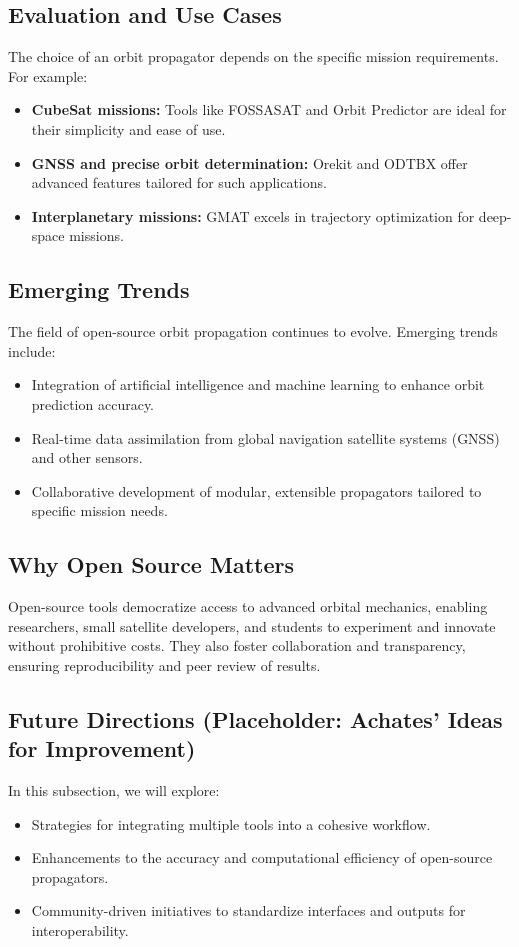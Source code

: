\documentclass[a4paper,10pt]{article}
\begin{document}
\subsection{Evaluation and Use Cases}
The choice of an orbit propagator depends on the specific mission requirements. For example:
\begin{itemize}
    \item \textbf{CubeSat missions:} Tools like FOSSASAT and Orbit Predictor are ideal for their simplicity and ease of use.
    \item \textbf{GNSS and precise orbit determination:} Orekit and ODTBX offer advanced features tailored for such applications.
    \item \textbf{Interplanetary missions:} GMAT excels in trajectory optimization for deep-space missions.
\end{itemize}

\subsection{Emerging Trends}
The field of open-source orbit propagation continues to evolve. Emerging trends include:
\begin{itemize}
    \item Integration of artificial intelligence and machine learning to enhance orbit prediction accuracy.
    \item Real-time data assimilation from global navigation satellite systems (GNSS) and other sensors.
    \item Collaborative development of modular, extensible propagators tailored to specific mission needs.
\end{itemize}

\subsection{Why Open Source Matters}
Open-source tools democratize access to advanced orbital mechanics, enabling researchers, small satellite developers, and students to experiment and innovate without prohibitive costs. They also foster collaboration and transparency, ensuring reproducibility and peer review of results.

\subsection{Future Directions (Placeholder: Achates' Ideas for Improvement)}
In this subsection, we will explore:
\begin{itemize}
    \item Strategies for integrating multiple tools into a cohesive workflow.
    \item Enhancements to the accuracy and computational efficiency of open-source propagators.
    \item Community-driven initiatives to standardize interfaces and outputs for interoperability.
\end{itemize}
\end{document}
